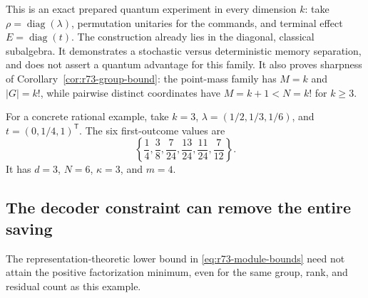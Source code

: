 This is an exact prepared quantum experiment in every dimension $k$: take
$\rho=\operatorname{diag}(\lambda)$, permutation unitaries for the commands,
and terminal effect $E=\operatorname{diag}(t)$. The construction already
lies in the diagonal, classical subalgebra. It demonstrates a stochastic
versus deterministic memory separation, and does not assert a quantum
advantage for this family. It also proves sharpness of
Corollary~\ref{cor:r73-group-bound}: the point-mass family has $M=k$ and
$|G|=k!$, while pairwise distinct coordinates have $M=k+1<N=k!$ for $k\ge3$.

For a concrete rational example, take $k=3$,
$\lambda=(1/2,1/3,1/6)$, and $t=(0,1/4,1)^{\mathsf T}$.
The six first-outcome values are
\[
 \left\{\frac14,\frac38,\frac7{24},\frac{13}{24},
                 \frac{11}{24},\frac7{12}\right\}.
\]
It has $d=3$, $N=6$, $\kappa=3$, and $m=4$.

\subsection{The decoder constraint can remove the entire saving}
The representation-theoretic lower bound in
\eqref{eq:r73-module-bounds} need not attain the positive factorization
minimum, even for the same group, rank, and residual count as this example.

